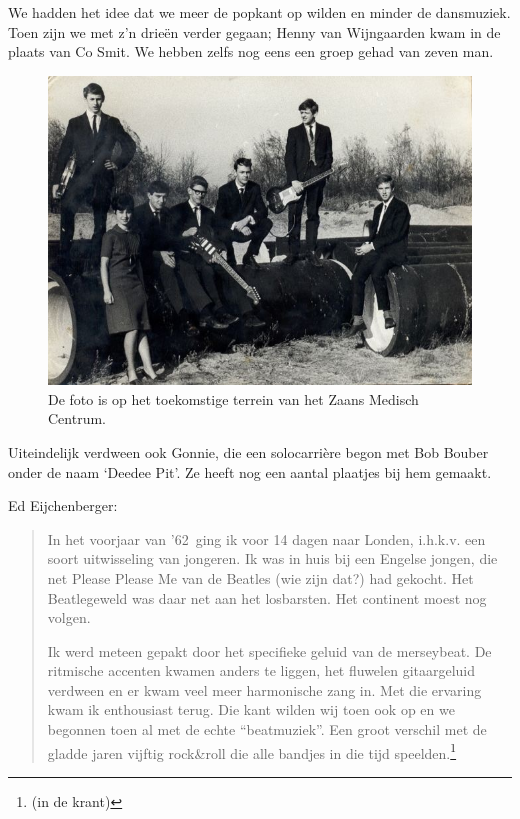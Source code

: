 \documentclass[10pt,twoside, openright]{memoir}
\begin{document}
We hadden het idee dat we meer de popkant op wilden en minder de dansmuziek. Toen zijn we met z’n drieën verder gegaan; Henny van Wijngaarden kwam in de plaats van Co Smit. We hebben zelfs nog eens een groep gehad van zeven man.

\begin{figure}
\includegraphics[width=\textwidth]{img/ch26/1965}
\caption*{\footnotesize De foto is op het toekomstige terrein van het Zaans Medisch Centrum.}
\end{figure}

Uiteindelijk verdween ook Gonnie, die een solocarrière begon met Bob Bouber onder de naam `Deedee Pit'. Ze heeft nog een aantal plaatjes bij hem gemaakt.

Ed Eijchenberger: 

\begin{quote}
In het voorjaar van '62 ging ik voor 14 dagen naar Londen, i.h.k.v. een soort uitwisseling van jongeren. Ik was in huis bij een Engelse jongen, die net Please Please Me van de Beatles (wie zijn dat?) had gekocht. Het Beatlegeweld was daar net aan het losbarsten. Het continent moest nog volgen. 

Ik werd meteen gepakt door het specifieke geluid van de merseybeat. De ritmische accenten kwamen anders te liggen, het fluwelen gitaargeluid verdween en er kwam veel meer harmonische zang in. Met die ervaring kwam ik enthousiast terug. Die kant wilden wij toen ook op en we begonnen toen al met de echte “beatmuziek”. Een groot verschil met de gladde jaren vijftig rock&roll die alle bandjes in die tijd speelden.\footnote{(in de krant)}
\end{quote}
\end{document}
